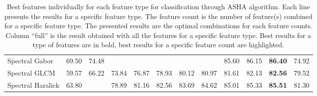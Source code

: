 \documentclass[../thesis.tex]{subfiles}
\begin{document}
\begin{table}[H]
\begin{tabular}{l c c c c c c c c c c|c}
            Spectral Gabor      & 69.50 & 74.48 & \cellcolor{green!30}{80.07} & \cellcolor{green!30}{82.23} & \cellcolor{green!30}{83.53} & \cellcolor{green!30}{84.52} & \cellcolor{green!30}{85.14} & 85.60 & 86.15 & \textbf{86.40} & 74.92 \\
            Spectral GLCM       & 59.57 & 66.22 & 73.84 & 76.87 & 78.93 & 80.12 & 80.97 & 81.61 & 82.13 & \textbf{82.56} & 79.52 \\
            Spectral Haralick   & 63.80 & \cellcolor{green!30}{75.85} & 78.89 & 81.16 & 82.56 & 83.69 & 84.62 & 85.01 & 85.33 & \textbf{85.51} & 81.30 \\
            \hline
        \end{tabular}
        \addtolength{\tabcolsep}{4pt}
        \caption{Best features individually for each feature type for classification through ASHA algorithm. Each line presents the results for a specific feature type. The feature count is the number of feature(s) combined for a specific feature type. The presented results are the optimal combinations for each feature counts. Column ``full'' is the result obtained with all the features for a specific feature type. Best results for a type of features are in bold, best results for a specific feature count are highlighted.}
        \label{tab:fv-subset-spectral}
    \end{table}
    
    
    
\end{document}
